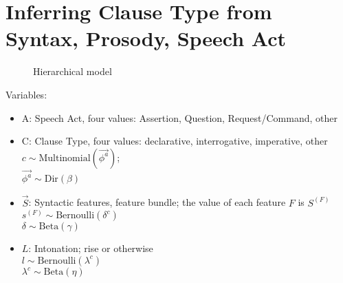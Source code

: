 
\chapter{Inferring Clause Type from Syntax, Prosody, Speech Act}
\label{appx:eng-model-dir}

\begin{figure}[H]
\begin{center}
\end{center}
\caption{Hierarchical model}\label{fig:appx-baseline}
\end{figure}

Variables:
\begin{itemize}
\item A: Speech Act, four values: Assertion, Question, Request/Command, other%
\item C: Clause Type, four values: declarative, interrogative, imperative, other\\
$ c \sim \mbox{Multinomial}(\vec{\phi^{a}})$;\\
$\vec{\phi^{a}} \sim \mbox{Dir}(\beta)$
\item $\vec{S}$: Syntactic features, feature bundle; 
the value of each feature $F$ is $S^{(F)}$ \\
$s^{(F)} \sim \mbox{Bernoulli}(\delta^{c})$ \\
$\delta\sim \mbox{Beta}(\gamma)$
\item $L$: Intonation; rise or otherwise\\
$l\sim\mbox{Bernoulli}(\lambda^{c}) $\\
$\lambda^{c}\sim\mbox{Beta}(\eta)$
\end{itemize}

